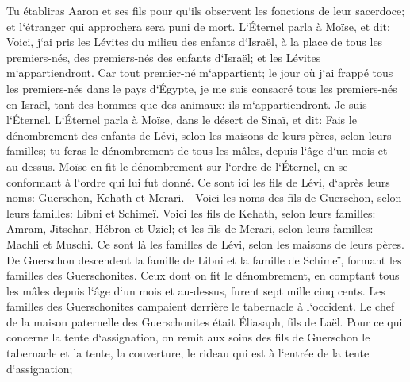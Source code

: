 \verse Tu établiras Aaron et ses fils pour qu`ils observent les fonctions de leur sacerdoce; et l`étranger qui approchera sera puni de mort. 
\verse L`Éternel parla à Moïse, et dit: 
\verse Voici, j`ai pris les Lévites du milieu des enfants d`Israël, à la place de tous les premiers-nés, des premiers-nés des enfants d`Israël; et les Lévites m`appartiendront. 
\verse Car tout premier-né m`appartient; le jour où j`ai frappé tous les premiers-nés dans le pays d`Égypte, je me suis consacré tous les premiers-nés en Israël, tant des hommes que des animaux: ils m`appartiendront. Je suis l`Éternel. 
\verse L`Éternel parla à Moïse, dans le désert de Sinaï, et dit: 
\verse Fais le dénombrement des enfants de Lévi, selon les maisons de leurs pères, selon leurs familles; tu feras le dénombrement de tous les mâles, depuis l`âge d`un mois et au-dessus. 
\verse Moïse en fit le dénombrement sur l`ordre de l`Éternel, en se conformant à l`ordre qui lui fut donné. 
\verse Ce sont ici les fils de Lévi, d`après leurs noms: Guerschon, Kehath et Merari. - 
\verse Voici les noms des fils de Guerschon, selon leurs familles: Libni et Schimeï. 
\verse Voici les fils de Kehath, selon leurs familles: Amram, Jitsehar, Hébron et Uziel; 
\verse et les fils de Merari, selon leurs familles: Machli et Muschi. Ce sont là les familles de Lévi, selon les maisons de leurs pères. 
\verse De Guerschon descendent la famille de Libni et la famille de Schimeï, formant les familles des Guerschonites. 
\verse Ceux dont on fit le dénombrement, en comptant tous les mâles depuis l`âge d`un mois et au-dessus, furent sept mille cinq cents. 
\verse Les familles des Guerschonites campaient derrière le tabernacle à l`occident. 
\verse Le chef de la maison paternelle des Guerschonites était Éliasaph, fils de Laël. 
\verse Pour ce qui concerne la tente d`assignation, on remit aux soins des fils de Guerschon le tabernacle et la tente, la couverture, le rideau qui est à l`entrée de la tente d`assignation; 
